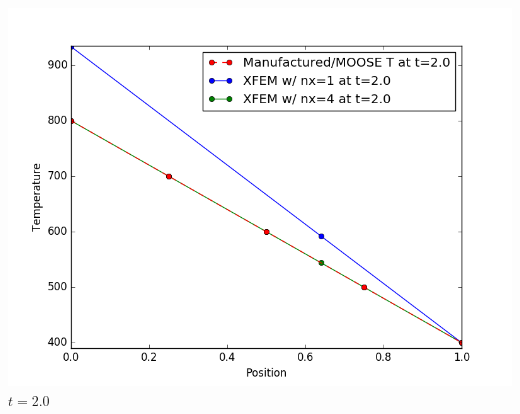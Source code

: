 \documentclass[]{beamer}
\begin{document}
\begin{frame}[t]
\begin{columns}
\begin{center}
			\includegraphics[scale=0.17]{figures/1D_xy_h1m/1D_xy_homog1mat_u_vs_x_20}\\
			$t=2.0$
			\end{center}
	\end{columns}
\end{frame}
\end{document}
